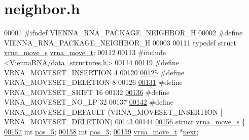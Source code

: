 \hypertarget{neighbor_8h_source}{}\section{neighbor.\+h}
\label{neighbor_8h_source}

\begin{DoxyCode}
00001 \textcolor{preprocessor}{#ifndef VIENNA\_RNA\_PACKAGE\_NEIGHBOR\_H}
00002 \textcolor{preprocessor}{#define VIENNA\_RNA\_PACKAGE\_NEIGHBOR\_H}
00003 
00111 \textcolor{keyword}{typedef} \textcolor{keyword}{struct }\hyperlink{group__neighbors_structvrna__move__s}{vrna\_move\_s} \hyperlink{group__neighbors_structvrna__move__s}{vrna\_move\_t};
00112 
00113 \textcolor{preprocessor}{#include <\hyperlink{data__structures_8h}{ViennaRNA/data\_structures.h}>}
00114 
\hyperlink{group__neighbors_gaf39028db9c70d3be528929182a3f2d5a}{00119} \textcolor{preprocessor}{#define VRNA\_MOVESET\_INSERTION   4}
00120 
\hyperlink{group__neighbors_gac05db9392c6647e3e9a6982096c5b384}{00125} \textcolor{preprocessor}{#define VRNA\_MOVESET\_DELETION    8}
00126 
\hyperlink{group__neighbors_ga68ea27c81de4b74e48b775c04052590b}{00131} \textcolor{preprocessor}{#define VRNA\_MOVESET\_SHIFT       16}
00132 
\hyperlink{group__neighbors_ga258084b251b218fba9398826435a4393}{00136} \textcolor{preprocessor}{#define VRNA\_MOVESET\_NO\_LP       32}
00137 
\hyperlink{group__neighbors_gaa5ffec4dd0d02df320f123e6888154d1}{00142} \textcolor{preprocessor}{#define VRNA\_MOVESET\_DEFAULT     (VRNA\_MOVESET\_INSERTION | VRNA\_MOVESET\_DELETION)}
00143 
00144 
\hyperlink{group__neighbors}{00156} \textcolor{keyword}{struct }\hyperlink{group__neighbors_structvrna__move__s}{vrna\_move\_s} \{
\hyperlink{group__neighbors_a8af908c74786675a456d0f20cc8fcb9b}{00157}   \textcolor{keywordtype}{int} \hyperlink{group__neighbors_a8af908c74786675a456d0f20cc8fcb9b}{pos\_5};  
\hyperlink{group__neighbors_a3849db905a45c4e399991df38705a36b}{00158}   \textcolor{keywordtype}{int} \hyperlink{group__neighbors_a3849db905a45c4e399991df38705a36b}{pos\_3};  
\hyperlink{group__neighbors_a181681bc3aab907d93e340df4777e759}{00159}   \hyperlink{group__neighbors_structvrna__move__s}{vrna\_move\_t} *\hyperlink{group__neighbors_a181681bc3aab907d93e340df4777e759}{next}; 

\end{DoxyCode}
